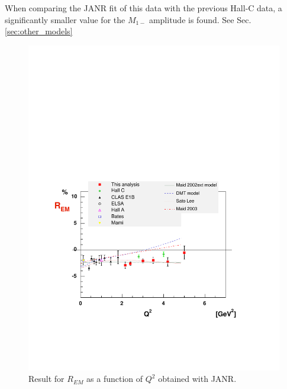 When comparing the JANR fit of this data with the previous Hall-C data, a significantly smaller value for the 
$M_{1-}$ amplitude is found. See Sec. \ref{sec:other_models}

\begin{figure}[h]
 \begin{center}
 \includegraphics[width = 13cm, bb=30 130 540 500]{analysis/img/JANR_REM} 
  \caption[JANR result for $R_{EM}$ as a function of $Q^2$]
{  Result for $R_{EM}$ as a function of $Q^2$ obtained with JANR.}
 \label{fig:JANRREM}
\end{center}
\end{figure}


